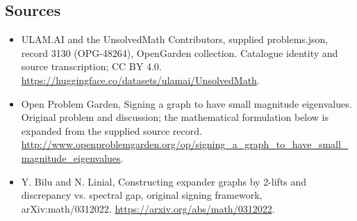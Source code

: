 \documentclass[11pt,a4paper]{article}
\begin{document}
\subsection{Sources}
\begin{itemize}
\item[S1] ULAM.AI and the UnsolvedMath Contributors, supplied problems.json, record 3130 (OPG-48264), OpenGarden collection. Catalogue identity and source transcription; CC BY 4.0.
\url{https://huggingface.co/datasets/ulamai/UnsolvedMath}.
\item[S2] Open Problem Garden, Signing a graph to have small magnitude eigenvalues. Original problem and discussion; the mathematical formulation below is expanded from the supplied source record.
\url{http://www.openproblemgarden.org/op/signing_a_graph_to_have_small_magnitude_eigenvalues}.
\item[S3] Y. Bilu and N. Linial, Constructing expander graphs by 2-lifts and discrepancy vs. spectral gap, original signing framework, arXiv:math/0312022.
\url{https://arxiv.org/abs/math/0312022}.
\end{itemize}
\end{document}
